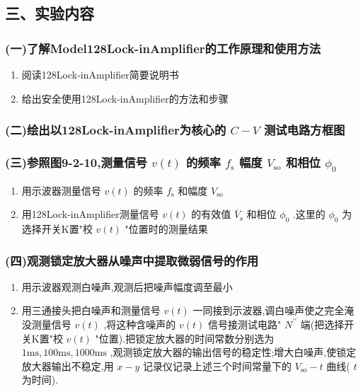 \documentclass[12pt,a4paper]{article}
\begin{document}
\subsection*{三、实验内容}

\subsubsection*{(一)了解Model128Lock-inAmplifier的工作原理和使用方法}
\begin{enumerate}
    \item 阅读128Lock-inAmplifier简要说明书
    \item 给出安全使用128Lock-inAmplifier的方法和步骤
\end{enumerate}

\subsubsection*{(二)绘出以128Lock-inAmplifier为核心的 \(C - V\) 测试电路方框图}

\subsubsection*{(三)参照图9-2-10,测量信号 \(v(t)\) 的频率 \(f_{\mathrm{s}}\) 幅度 \(V_{\mathrm{so}}\) 和相位 \(\phi_{0}\)}
\begin{enumerate}
    \item 用示波器测量信号 \(v(t)\) 的频率 \(f_{\mathrm{s}}\) 和幅度 \(V_{\mathrm{so}}\)
    \item 用128Lock-inAmplifier测量信号 \(v(t)\) 的有效值 \(\overline{{V}}_{\mathrm{s}}\) 和相位 \(\phi_{0}\) .这里的 \(\phi_{0}\) 为选择开关K置"校 \(v(t)\) "位置时的测量结果
\end{enumerate}

\subsubsection*{(四)观测锁定放大器从噪声中提取微弱信号的作用}
\begin{enumerate}
    \item 用示波器观测白噪声,观测后把噪声幅度调至最小
    \item 用三通接头把白噪声和测量信号 \(v(t)\) 一同接到示波器,调白噪声使之完全淹没测量信号 \(v(t)\) ,将这种含噪声的 \(v(t)\) 信号接测试电路" \(N^{\prime \prime}\) 端(把选择开关K置"校 \(v(t)\) "位置).把锁定放大器的时间常数分别选为 \(1\mathrm{ms},100\mathrm{ms},1000\mathrm{ms}\) ,观测锁定放大器的输出信号的稳定性;增大白噪声,使锁定放大器输出不稳定,用 \(x - y\) 记录仪记录上述三个时间常量下的 \(V_{\mathrm{so}} - t\) 曲线( \(t\) 为时间).
\end{enumerate}
\end{document}
